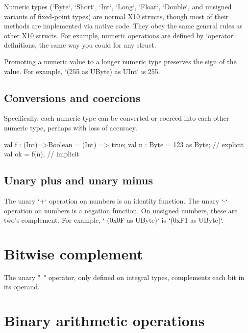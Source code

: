 Numeric types (\xcd`Byte`, \xcd`Short`, \xcd`Int`, \xcd`Long`, \xcd`Float`,
\xcd`Double`, and unsigned variants of fixed-point types) are normal X10
structs, though most of their methods are implemented via native code. They
obey the same general rules as other X10 structs. For example, numeric
operations are defined by \xcd`operator` definitions, the same way you could
for any struct.

Promoting a numeric value to a longer numeric type preserves the sign of the
value.  For example, \xcd`(255 as UByte) as UInt` is 255.  

\subsection{Conversions and coercions}

Specifically, each numeric type can be converted or coerced into each other
numeric type, perhaps with loss of accuracy.
\begin{xten}
val f : (Int)=>Boolean = (Int) => true; 
val n : Byte = 123 as Byte; // explicit 
val ok = f(n); // implicit
\end{xten}



\subsection{Unary plus and unary minus}

The unary \xcd`+` operation on numbers is an identity function.
The unary \xcd`-` operation on numbers is a negation function.
On unsigned numbers, these are two's-complement.  For example, 
\xcd`-(0x0F as UByte)` is 
\xcd`(0xF1 as UByte)`.



\section{Bitwise complement}

The unary \xcd"~" operator, only defined on integral types, complements each
bit in its operand.  

\section{Binary arithmetic operations} 

